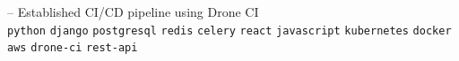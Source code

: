 \begin{entrylist}
{        -- Established CI/CD pipeline using Drone CI\\
        \texttt{python}\slashsep
        \texttt{django}\slashsep
        \texttt{postgresql}\slashsep
        \texttt{redis}\slashsep
        \texttt{celery}\slashsep
        \texttt{react}\slashsep
        \texttt{javascript}\slashsep
        \texttt{kubernetes}\slashsep
        \texttt{docker}\slashsep
        \texttt{aws}\slashsep
        \texttt{drone-ci}\slashsep
        \texttt{rest-api}\slashsep
    }
\end{entrylist}



